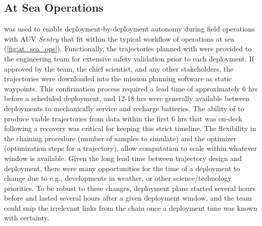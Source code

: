 \subsection{At Sea Operations}
\PHORTEX was used to enable deployment-by-deployment autonomy during field operations with AUV \emph{Sentry} that fit within the typical workflow of operations at sea (\cref{fig:at_sea_ops}). Functionally, the trajectories planned with \PHORTEX were provided to the \Sentry engineering team for extensive safety validation prior to each deployment. If approved by the \Sentry team, the chief scientist, and any other stakeholders, the trajectories were downloaded into the \Sentry mission planning software as static waypoints. This confirmation process required a lead time of approximately 6 hrs before a scheduled deployment, and 12-18 hrs were generally available between deployments to mechanically service \Sentry and recharge batteries. The ability of \PHORTEX to produce viable trajectories from data within the first 6 hrs that \Sentry was on-deck following a recovery was critical for keeping this strict timeline. The flexibility in the \PHUMES chaining procedure (number of samples to simulate) and the \PHORTEX optimizer (optimization steps for a trajectory), allow computation to scale within whatever window is available. Given the long lead time between trajectory design and \Sentry deployment, there were many opportunities for the time of a deployment to change due to e.g., developments in weather, or other science/technology priorities. To be robust to these changes, deployment plans started several hours before and lasted several hours after a given deployment window, and the \Sentry team could snip the irrelevant links from the chain once a deployment time was known with certainty.

